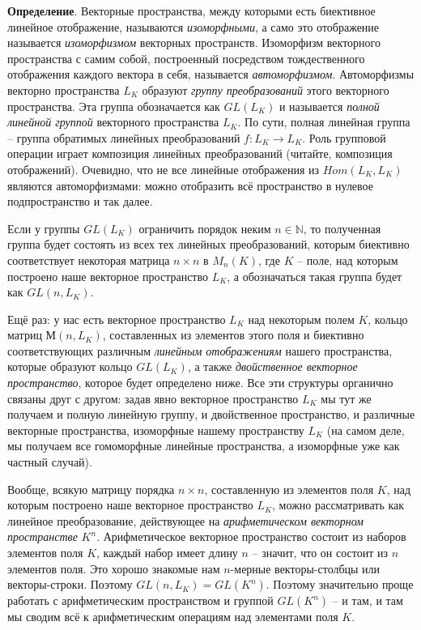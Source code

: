 \documentclass[a4paper]{book}
\begin{document}
\textbf{Определение}. Векторные пространства, между которыми есть биективное линейное отображение, называются \textit{изоморфными}, а само это отображение называется \textit{изоморфизмом} векторных пространств. Изоморфизм векторного пространства с самим собой, построенный посредством тождественного отображения каждого вектора в себя, называется \textit{автоморфизмом}. Автоморфизмы векторно пространства $L_K$ образуют \textit{группу преобразований} этого векторного пространства. Эта группа обозначается как $GL(L_K)$ и называется \textit{полной линейной группой} векторного пространства $L_K$. По сути, полная линейная группа -- группа обратимых линейных преобразований $f: L_K \rightarrow L_K$. Роль групповой операции играет композиция линейных преобразований (читайте, композиция отображений). Очевидно, что не все линейные отображения из $Hom(L_K,L_K)$ являются автоморфизмами: можно отобразить всё пространство в нулевое подпространство и так далее. 

Если у группы $GL(L_K)$ ограничить порядок неким $n\in \mathbb{N}$, то полученная группа будет состоять из всех тех линейных преобразований, которым биективно соответствует некоторая матрица $n\times n$ в $M_n(K)$, где $K$ -- поле, над которым построено наше векторное пространство $L_K$, а обозначаться такая группа будет как $GL(n,L_K)$.

Ещё раз: у нас есть векторное пространство $L_K$ над некоторым полем $K$, кольцо матриц $М(n,L_K)$, составленных из элементов этого поля и биективно соответствующих различным \textit{линейным отображениям} нашего пространства, которые образуют кольцо $GL(L_K)$, а также \textit{двойственное векторное пространство}, которое будет определено ниже. Все эти структуры органично связаны друг с другом: задав явно векторное пространство $L_K$ мы тут же получаем и полную линейную группу, и двойственное пространство, и различные векторные пространства, изоморфные нашему пространству $L_K$ (на самом деле, мы получаем все гомоморфные линейные пространства, а изоморфные уже как частный случай). 

Вообще, всякую матрицу порядка $n\times n$, составленную из элементов поля $K$, над которым построено наше векторное пространство $L_K$, можно рассматривать как линейное преобразование, действующее на \textit{арифметическом векторном пространстве} $K^n$. Арифметическое векторное пространство состоит из наборов элементов поля $K$, каждый набор имеет длину $n$ -- значит, что он состоит из $n$ элементов поля. Это хорошо знакомые нам $n$-мерные векторы-столбцы или векторы-строки. Поэтому $GL(n,L_K) = GL(K^n)$. Поэтому значительно проще работать с арифметическим пространством и группой $GL(K^n)$ -- и там, и там мы сводим всё к арифметическим операциям над элементами поля $K$. 
\end{document}
